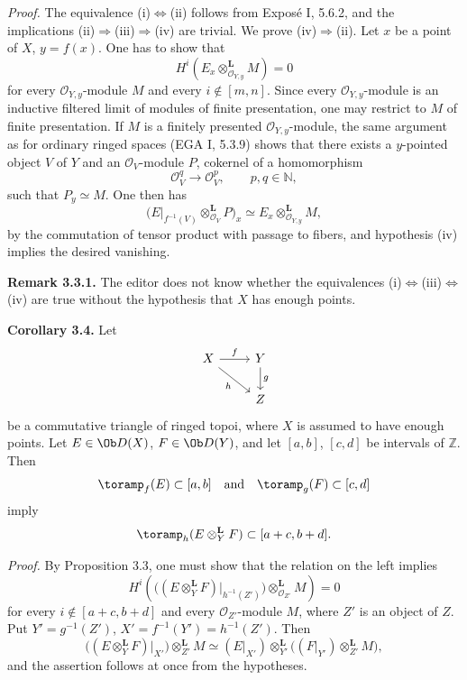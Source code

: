 \documentclass[11pt]{article}
\begin{document}
\emph{Proof.} The equivalence (i)\(\Longleftrightarrow\)(ii) follows from Exposé I, 5.6.2, and the implications (ii)\(\Rightarrow\)(iii)\(\Rightarrow\)(iv) are trivial. We prove (iv)\(\Rightarrow\)(ii). Let \(x\) be a point of \(X\), \(y=f(x)\). One has to show that
\[
  H^i(E_x\otimes_{\mathcal O_{Y,y}}^{\mathbf L}M)=0
\]
for every \(\mathcal O_{Y,y}\)-module \(M\) and every \(i\notin[m,n]\). Since every \(\mathcal O_{Y,y}\)-module is an inductive filtered limit of modules of finite presentation, one may restrict to \(M\) of finite presentation. If \(M\) is a finitely presented \(\mathcal O_{Y,y}\)-module, the same argument as for ordinary ringed spaces (EGA I, 5.3.9) shows that there exists a \(y\)-pointed object \(V\) of \(Y\) and an \(\mathcal O_V\)-module \(P\), cokernel of a homomorphism
\[
  \mathcal O_V^q\longrightarrow\mathcal O_V^p,
  \qquad p,q\in\mathbb N,
\]
such that \(P_y\simeq M\). One then has
\[
  \bigl(E\vert_{f^{-1}(V)}\otimes_{\mathcal O_V}^{\mathbf L}P\bigr)_x
  \simeq
  E_x\otimes_{\mathcal O_{Y,y}}^{\mathbf L}M,
\]
by the commutation of tensor product with passage to fibers, and hypothesis (iv) implies the desired vanishing.

\textbf{Remark 3.3.1.} The editor does not know whether the equivalences (i)\(\Longleftrightarrow\)(iii)\(\Longleftrightarrow\)(iv) are true without the hypothesis that \(X\) has enough points.

\textbf{Corollary 3.4.} Let
\[
\begin{tikzcd}
X \arrow[r,"f"] \arrow[dr,"h"'] & Y \arrow[d,"g"]\\
& Z
\end{tikzcd}
\]
be a commutative triangle of ringed topoi, where \(X\) is assumed to have enough points. Let \(E\in\Ob D(X)\), \(F\in\Ob D(Y)\), and let \([a,b]\), \([c,d]\) be intervals of \(\mathbb Z\). Then
\[
  \toramp_f(E)\subset[a,b]\quad\text{and}\quad \toramp_g(F)\subset[c,d]
\]
imply
\[
  \toramp_h(E\otimes_Y^{\mathbf L}F)\subset[a+c,b+d].
\]

\emph{Proof.} By Proposition 3.3, one must show that the relation on the left implies
\[
  H^i\left(\bigl((E\otimes_Y^{\mathbf L}F)\vert_{h^{-1}(Z')}\bigr)
    \otimes_{\mathcal O_{Z'}}^{\mathbf L}M\right)=0
\]
for every \(i\notin[a+c,b+d]\) and every \(\mathcal O_{Z'}\)-module \(M\), where \(Z'\) is an object of \(Z\). Put \(Y'=g^{-1}(Z')\), \(X'=f^{-1}(Y')=h^{-1}(Z')\). Then
\[
  \bigl((E\otimes_Y^{\mathbf L}F)\vert_{X'}\bigr)\otimes_{Z'}^{\mathbf L}M
  \simeq
  (E\vert_{X'})\otimes_{Y'}^{\mathbf L}\bigl((F\vert_{Y'})\otimes_{Z'}^{\mathbf L}M\bigr),
\]
and the assertion follows at once from the hypotheses.
\end{document}
